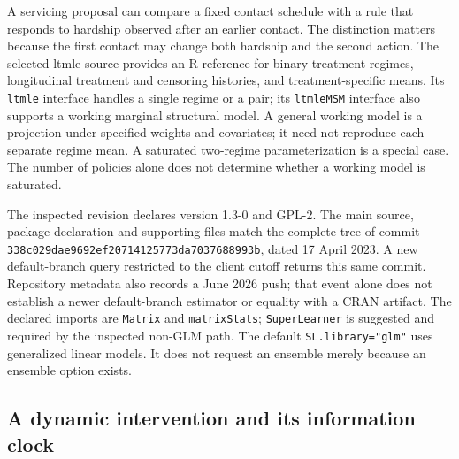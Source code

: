 A servicing proposal can compare a fixed contact schedule with a rule that
responds to hardship observed after an earlier contact. The distinction matters
because the first contact may change both hardship and the second action.
The selected ltmle source provides an R reference for binary treatment regimes,
longitudinal treatment and censoring histories, and treatment-specific means.
Its \texttt{ltmle} interface handles a single regime or a pair; its
\texttt{ltmleMSM} interface also supports a working marginal structural model.
A general working model is a projection under specified weights and covariates;
it need not reproduce each separate regime mean. A saturated two-regime
parameterization is a special case. The number of policies alone does not
determine whether a working model is saturated.~\citep{exec23_ltmle_source}

The inspected revision declares version 1.3-0 and GPL-2. The main source,
package declaration and supporting files match the complete tree of commit
\texttt{338c029d}\allowbreak\texttt{ae9692ef}\allowbreak\texttt{20714125}\allowbreak\texttt{773da703}\allowbreak\texttt{7688993b}, dated 17 April 2023.
A new default-branch query restricted to the client cutoff returns this same
commit. Repository metadata also records a June 2026 push; that event alone
does not establish a newer default-branch estimator or equality with a CRAN
artifact. The declared imports are \texttt{Matrix} and \texttt{matrixStats};
\texttt{SuperLearner} is suggested and required by the inspected non-GLM path.
The default \texttt{SL.library="glm"} uses generalized linear models. It does
not request an ensemble merely because an ensemble option exists.
\citep{exec23_ltmle_source}

\subsection{A dynamic intervention and its information clock}

